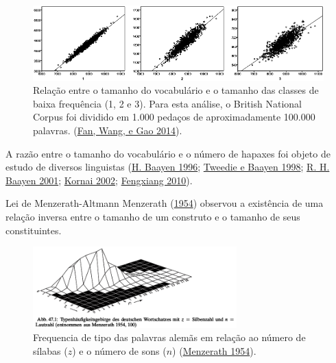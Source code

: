 \documentclass[
  ignorenonframetext,
  aspectratio=169]{beamer}
\begin{document}
\begin{frame}
\begin{figure}
\centering
\includegraphics[width=1\textwidth,height=\textheight]{fan2014-richness.png}
\caption{Relação entre o tamanho do vocabulário e o tamanho das classes
de baixa frequência (1, 2 e 3). Para esta análise, o British National
Corpus foi dividido em 1.000 pedaços de aproximadamente 100.000
palavras. (\protect\hyperlink{ref-fan2014some}{Fan, Wang, e Gao 2014}).}
\end{figure}
\end{frame}

\begin{frame}
A razão entre o tamanho do vocabulário e o número de hapaxes foi objeto
de estudo de diversos linguistas
(\protect\hyperlink{ref-baayen1996effects}{H. Baayen 1996};
\protect\hyperlink{ref-tweedie1998variable}{Tweedie e Baayen 1998};
\protect\hyperlink{ref-baayen2001word}{R. H. Baayen 2001};
\protect\hyperlink{ref-kornai2002many}{Kornai 2002};
\protect\hyperlink{ref-fengxiang2010asymptotic}{Fengxiang 2010}).
\end{frame}

\begin{frame}{Lei de Menzerath-Altmann}
\protect\hypertarget{lei-de-menzerath-altmann}{}
Menzerath (\protect\hyperlink{ref-menzerath1954}{1954}) observou a
existência de uma relação inversa entre o tamanho de um construto e o
tamanho de seus constituintes.

\begin{figure}
\centering
\includegraphics[width=0.7\textwidth,height=\textheight]{menzerath-fig471.png}
\caption{Frequencia de tipo das palavras alemãs em relação ao número de
sílabas (\(z\)) e o número de sons (\(n\))
(\protect\hyperlink{ref-menzerath1954}{Menzerath 1954}).}
\end{figure}
\end{frame}
\end{document}
